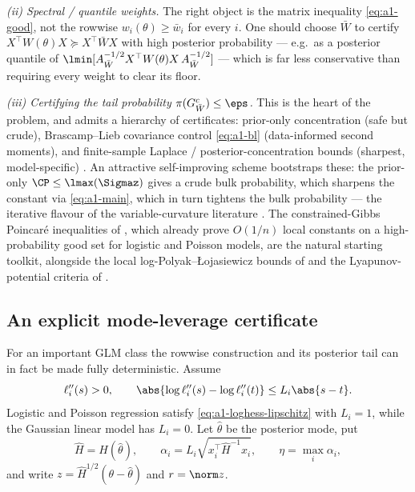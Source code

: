 \documentclass[../../main.tex]{subfiles}
\begin{document}
\emph{(ii) Spectral / quantile weights.} The right object is the matrix inequality
\eqref{eq:a1-good}, not the rowwise $w_i(\theta)\ge\bar w_i$ for every $i$. One should choose
$\bar W$ to certify $X^\top W(\theta)X\succeq X^\top\bar W X$ with high posterior probability ---
e.g.\ as a posterior quantile of $\lmin[A_{\bar W}^{-1/2}X^\top W(\theta)X\,A_{\bar W}^{-1/2}]$ ---
which is far less conservative than requiring every weight to clear its floor.

\emph{(iii) Certifying the tail probability $\pi(G_{\bar W}^c)\le\eps$.} This is the heart of the
problem, and admits a hierarchy of certificates: prior-only concentration (safe but crude),
Brascamp--Lieb covariance control \eqref{eq:a1-bl} (data-informed second moments), and
finite-sample Laplace / posterior-concentration bounds (sharpest, model-specific)
\cite{KasprzakGiordanoBroderick2025}. An attractive self-improving scheme bootstraps these: the
prior-only $\CP\le\lmax(\Sigmaz)$ gives a crude bulk probability, which sharpens the constant via
\eqref{eq:a1-main}, which in turn tightens the bulk probability --- the iterative flavour of the
variable-curvature literature \cite{cattiaux2018poincare,CattiauxGuillin2022Perturbed}. The
constrained-Gibbs Poincar\'e inequalities of \cite{ConstrainedGibbs2026}, which already prove
$O(1/n)$ local constants on a high-probability good set for logistic and Poisson models, are the
natural starting toolkit, alongside the local log-Polyak--{\L}ojasiewicz bounds of
\cite{GongHeShen2025LogPL} and the Lyapunov-potential criteria of \cite{ChenSridharan2024Lyapunov}.

\subsection{An explicit mode-leverage certificate}
\label{subsec:a1-mode-leverage}

For an important GLM class the rowwise construction and its posterior tail can in fact be made
fully deterministic. Assume
\begin{equation}\label{eq:a1-loghess-lipschitz}
  \ell_i''(s)>0,
  \qquad
  \abs{\log\ell_i''(s)-\log\ell_i''(t)}\le L_i\abs{s-t}.
\end{equation}
Logistic and Poisson regression satisfy \eqref{eq:a1-loghess-lipschitz} with $L_i=1$, while the
Gaussian linear model has $L_i=0$. Let $\hat\theta$ be the posterior mode, put
\begin{equation}\label{eq:a1-leverage}
 \widehat H=H(\hat\theta),\qquad
 \alpha_i=L_i\sqrt{x_i^\top\widehat H^{-1}x_i},\qquad
 \eta=\max_i\alpha_i,
\end{equation}
and write $z=\widehat H^{1/2}(\theta-\hat\theta)$ and $r=\norm z$.
\end{document}
